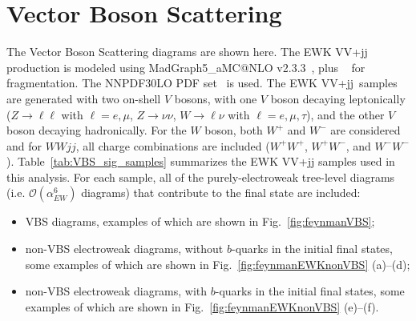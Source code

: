 \section{Vector Boson Scattering}
The Vector Boson Scattering diagrams are shown here.
The EWK VV+jj production is modeled using MadGraph5\_aMC@NLO v2.3.3~\cite{Alwall:2014hca},
plus ~\cite{Sjostrand:2007gs} for fragmentation.
The \textsc{NNPDF30LO} PDF set~\cite{Ball:2012cx} is used.
The EWK VV+jj\ samples are generated with two on-shell $V$ bosons, with one $V$ boson decaying leptonically
($Z\to \ell\ell$ with $\ell = e, \mu$, $Z\to \nu\nu$, $W\to \ell \nu$ with $\ell= e, \mu, \tau$),
and the other $V$ boson decaying hadronically.
For the $W$ boson, both $W^{+}$ and $W^{-}$ are considered and for $WWjj$, all charge combinations are included
($W^{+}W^{+}$, $W^{+}W^{-}$, and $W^{-}W^{-}$).
Table~\ref{tab:VBS_sig_samples} summarizes the EWK VV+jj samples used in this analysis.
For each sample, all of the purely-electroweak tree-level diagrams (i.e. $\mathcal{O}(\alpha_{EW}^6)$ diagrams)
that contribute to the final state are included:
\begin{itemize}
  \item VBS diagrams, examples of which are shown in Fig.~\ref{fig:feynmanVBS};
  \item non-VBS electroweak diagrams, without $b$-quarks in the initial final states, some examples of which are shown in Fig.~\ref{fig:feynmanEWKnonVBS} (a)--(d);
  \item non-VBS electroweak diagrams, with $b$-quarks in the initial final states, some examples of which are shown in Fig.~\ref{fig:feynmanEWKnonVBS} (e)--(f).
\end{itemize}

